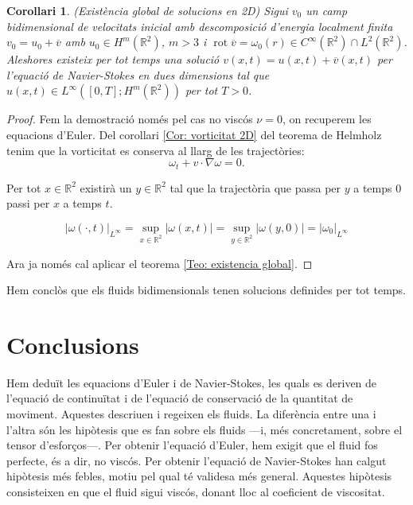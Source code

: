 \documentclass{article}
\numberwithin{equation}{section}
\DeclareMathOperator{\rot}{rot}
\newtheorem{corollari}{Corol\textperiodcentered lari}[section]
\begin{document}
\begin{corollari}
(Exist\`{e}ncia global de solucions en 2D) Sigui $v_0$ un camp bidimensional de velocitats inicial amb descomposici\'{o} d'energia localment finita $v_0=u_0+\overline v$ amb $u_0\in H^m(\mathbb{R}^2)$, $m>3$ i $\rot\overline v=\omega_0(r)\in C^{\infty}(\mathbb{R}^2)\cap L^2(\mathbb{R}^2)$. Aleshores existeix per tot temps una soluci\'{o} $v(x,t)=u(x,t)+\overline v(x,t)$ per l'equaci\'{o} de Navier-Stokes en dues dimensions tal que $u(x,t)\in L^{\infty}([0,T];H^m(\mathbb{R}^2))$ per tot $T>0$.
\end{corollari}
\begin{proof}
Fem la demostraci\'{o} nom\'{e}s pel cas no visc\'{o}s $\nu=0$, on recuperem les equacions d'Euler. Del corol\textperiodcentered lari \ref{Cor: vorticitat 2D} del teorema de Helmholz tenim que la vorticitat es conserva al llarg de les traject\`{o}ries:
\[\omega_t+v\cdot\nabla\omega=0.\]

Per tot $x\in\mathbb{R}^2$ existir\`{a} un $y\in\mathbb{R}^2$ tal que la traject\`{o}ria que passa per $y$ a temps $0$ passi per $x$ a temps $t$.

\[|\omega(\cdot,t)|_{L^{\infty}}=\sup_{x\in\mathbb{R}^2}|\omega(x,t)|=\sup_{y\in\mathbb{R}^2}|\omega(y,0)|=|\omega_0|_{L^{\infty}}\]

Ara ja nom\'{e}s cal aplicar el teorema \ref{Teo: existencia global}.
\end{proof}

Hem concl\`{o}s que els fluids bidimensionals tenen solucions definides per tot temps.

\section{Conclusions}

Hem dedu\"{i}t les equacions d'Euler i de Navier-Stokes, les quals es deriven de l'equaci\'{o} de continu\"{i}tat i de l'equaci\'{o} de conservaci\'{o} de la quantitat de moviment. Aquestes descriuen i regeixen els fluids. La difer\`{e}ncia entre una i l'altra s\'{o}n les hip\`{o}tesis que es fan sobre els fluids ---i, m\'{e}s concretament, sobre el tensor d'esfor\c{c}os---. Per obtenir l'equaci\'{o} d'Euler, hem exigit que el fluid fos perfecte, \'{e}s a dir, no visc\'{o}s. Per obtenir l'equaci\'{o} de Navier-Stokes han calgut hip\`{o}tesis m\'{e}s febles, motiu pel qual t\'{e} validesa m\'{e}s general. Aquestes hip\`{o}tesis consisteixen en que el fluid sigui visc\'{o}s, donant lloc al coeficient de viscositat.
\end{document}
